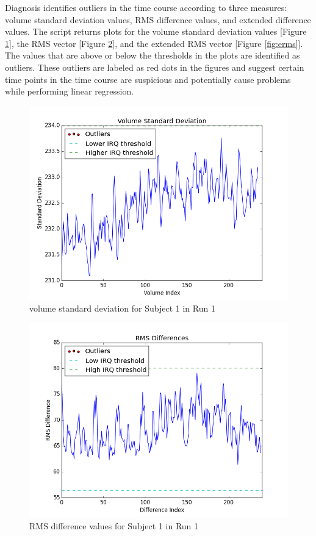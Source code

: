 \par \indent Diagnosis identifies outliers in the time course according to
three measures: volume standard deviation values, RMS difference values, and
extended difference values. The script returns plots for the volume standard
deviation values [Figure \ref{fig:vol_std}], the RMS vector 
[Figure \ref{fig:rms}], and the extended RMS vector [Figure \ref{fig:erms}]. 
The values that are above or below the thresholds in the plots are identified 
as outliers. These outliers are labeled as red dots in the figures and suggest
certain time points in the time course are suspicious and potentially cause 
problems while performing linear regression.

\begin{figure}[h!]
\centering
\includegraphics[width=120mm]{images/vol_std.png}
\caption{volume standard deviation for Subject 1 in Run 1}
\label{fig:vol_std}
\end{figure}

\begin{figure}[h!]
\centering
\includegraphics[width=120mm]{images/vol_rms_outliers.png}
\caption{RMS difference values for Subject 1 in Run 1}
\label{fig:rms}
\end{figure}

